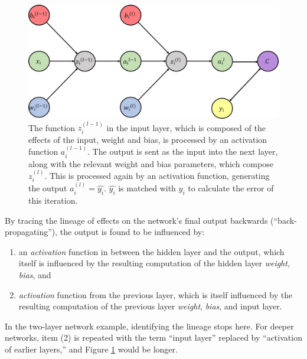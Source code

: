 \begin{figure}[H]
\centering
    \vspace{0pt}
    \includegraphics[width = .75\textwidth]{Figures/BACKpROPdag.png}
    \caption{\footnotesize The function $z_i^{(l-1)}$ in the input layer, which is composed of the effects of the input, weight and bias, is processed by an activation function $a_i^{(l-1)}$.  The output is sent as the input into the next layer, along with the relevant weight and bias parameters, which compose $z_i^{(l)}$.  This is processed again by an activation function, generating the output $a_i^{(l)} = \hat{y_i}$.  $\hat{y_i}$ is matched with $y_i$ to calculate the error of this iteration.}
    \label{backpropDAG}
    \vspace{0pt}
\end{figure}

By tracing the lineage of effects on the network's final output backwards (``back-propagating''), the output is found to be influenced by:

\begin{enumerate}
\tightlist
\item
  an \textit{activation} function in between the hidden layer and the output,
  which itself is influenced by the resulting computation of the hidden layer \emph{weight}, \emph{bias}, and
\item
  \textit{activation} function from the previous layer, which is itself
  influenced by the resulting computation of the previous layer
  \emph{weight}, \emph{bias}, and input layer.
\end{enumerate}

In the two-layer network example, identifying the lineage stops here.  For deeper networks, item (2) is repeated with the term ``input layer'' replaced by ``activation of earlier layers,'' and Figure \ref{backpropDAG} would be longer.




